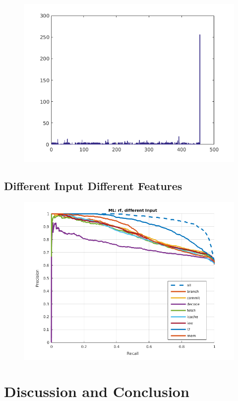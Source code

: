 \documentclass{sig-alternate}
\begin{document}
\begin{figure}[t]
\begin{center}
   \includegraphics[width=0.95\linewidth]{./figures/feat_diff.png}
\end{center}
   \caption{}
\label{fig:feat-diff}
\end{figure}

\subsection{Different Input Different Features}

\begin{figure}[t]
\begin{center}
   \includegraphics[width=0.95\linewidth]{./figures/didf.png}
\end{center}
   \caption{}
\label{fig:didf}
\end{figure}


\section{Discussion and Conclusion}
\cite{lamport94}




\end{document}
